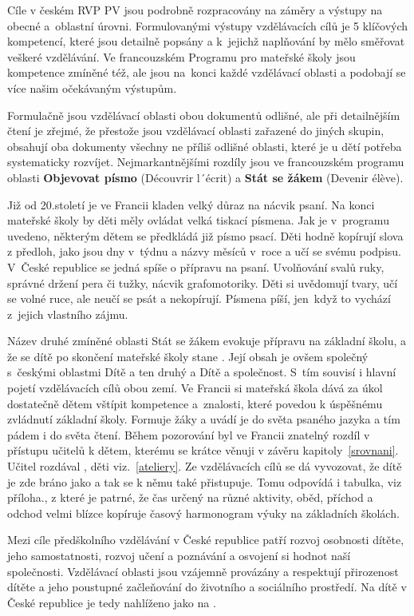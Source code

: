 	Cíle v českém RVP PV jsou podrobně rozpracovány na záměry a výstupy na obecné a oblastní úrovni. Formulovanými výstupy vzdělávacích cílů je 5 klíčových kompetencí, které jsou detailně popsány a k jejichž naplňování by mělo směřovat veškeré vzdělávání. Ve francouzském Programu pro mateřské školy jsou kompetence zmíněné též, ale jsou na konci každé vzdělávací oblasti a podobají se více našim očekávaným výstupům.

	Formulačně jsou vzdělávací oblasti obou dokumentů odlišné, ale při detailnějším čtení je zřejmé, že přestože jsou vzdělávací oblasti zařazené do jiných skupin, obsahují oba dokumenty všechny ne příliš odlišné oblasti, které je u dětí potřeba systematicky rozvíjet. Nejmarkantnějšími rozdíly jsou ve francouzském programu oblasti \textbf{Objevovat písmo} (Découvrir l´écrit) a \textbf{Stát se žákem} (Devenir élève).

	Již od 20.století je ve Francii kladen velký důraz na nácvik psaní. Na konci mateřské školy by děti měly ovládat velká tiskací písmena. Jak je v programu uvedeno, některým dětem se předkládá již písmo psací. Děti hodně kopírují slova z předloh, jako jsou dny v týdnu a názvy měsíců v roce a učí se svému podpisu. V České republice se jedná spíše o přípravu na psaní. Uvolňování svalů ruky, správné držení pera či tužky, nácvik grafomotoriky. Děti si uvědomují tvary, učí se volné ruce, ale neučí se psát a nekopírují. Písmena píší, jen když to vychází z jejich vlastního zájmu. 

	Název druhé zmíněné oblasti Stát se žákem evokuje přípravu na základní školu, a že se dítě po skončení mateřské školy stane . Její obsah je ovšem společný s českými oblastmi Dítě a ten druhý a Dítě a společnost. S tím souvisí i hlavní pojetí vzdělávacích cílů obou zemí. Ve Francii si mateřská škola dává za úkol dostatečně dětem vštípit kompetence a znalosti, které povedou k úspěšnému zvládnutí základní školy. Formuje žáky a uvádí je do světa psaného jazyka a tím pádem i do světa čtení. Během pozorování byl ve Francii znatelný rozdíl v přístupu učitelů k dětem, kterému se krátce věnuji v závěru kapitoly~\ref{srovnani}. Učitel rozdával , děti  viz.~\ref{ateliery}. Ze vzdělávacích cílů se dá vyvozovat, že dítě je zde bráno jako  a tak se k němu také přistupuje. Tomu odpovídá i tabulka, viz příloha., z které je patrné, že čas určený na různé aktivity, oběd, příchod a odchod velmi blízce kopíruje časový harmonogram výuky na základních školách. 

	Mezi cíle předškolního vzdělávání v České republice patří rozvoj osobnosti dítěte, jeho samostatnosti, rozvoj učení a poznávání a osvojení si hodnot naší společnosti. Vzdělávací oblasti jsou vzájemně provázány a respektují přirozenost dítěte a jeho poustupné začleňování do životního a sociálního prostředí. Na dítě v České republice je tedy nahlíženo jako na .

